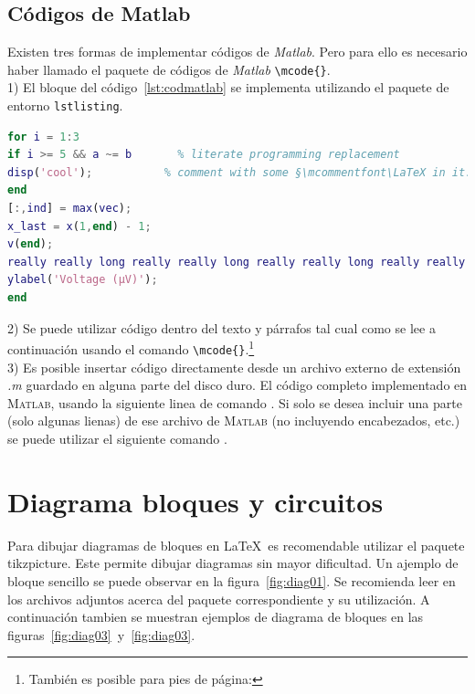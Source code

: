 \documentclass[
10pt,			%
letterpaper,	%
oneside,		%
headinclude, footinclude, %
BCOR5mm, 		%
]{scrartcl}
\begin{document}
\subsection{Códigos de Matlab}
Existen tres formas de implementar códigos de \textit{Matlab}. Pero para ello es necesario haber llamado el paquete de códigos de \textit{Matlab} \verb|\mcode{}|.\\
1) El bloque del código~\ref{lst:codmatlab} se implementa utilizando el paquete de entorno \verb|lstlisting|.
\begin{lstlisting}[language=matlab,caption={Código Matlab que hace algo},label={lst:codmatlab}]
for i = 1:3
if i >= 5 && a ~= b       % literate programming replacement
disp('cool');           % comment with some §\mcommentfont\LaTeX in it: $\mcommentfont\pi x^2$§
end
[:,ind] = max(vec);
x_last = x(1,end) - 1;
v(end);
really really long really really long really really long really really long really really long line % blaaaaaaaa
ylabel('Voltage (µV)');
end
\end{lstlisting}
2) Se puede utilizar código dentro del texto y párrafos tal cual como se lee a continuación   usando el comando \verb|\mcode{}|.\footnote{También es posible para pies de página: }\\
3) Es posible insertar código directamente desde un archivo externo de extensión \textit{.m} guardado en alguna parte del disco duro. El código completo implementado en \textsc{Matlab}, usando la siguiente linea de comando \verb||. Si solo se desea incluir una parte (solo algunas lienas) de ese archivo de \textsc{Matlab} (no incluyendo encabezados, etc.) se puede utilizar el siguiente comando \verb||.
%
\section{Diagrama bloques y circuitos}

Para dibujar diagramas de bloques en \LaTeX \, es recomendable utilizar el paquete tikzpicture. Este permite dibujar diagramas sin mayor dificultad. Un ajemplo de bloque sencillo se puede observar en la figura~\ref{fig:diag01}. Se recomienda leer en los archivos adjuntos acerca del paquete correspondiente y su utilización. A continuación tambien se muestran ejemplos de diagrama de bloques en las figuras~\ref{fig:diag03}~y~\ref{fig:diag03}. 
\end{document}
